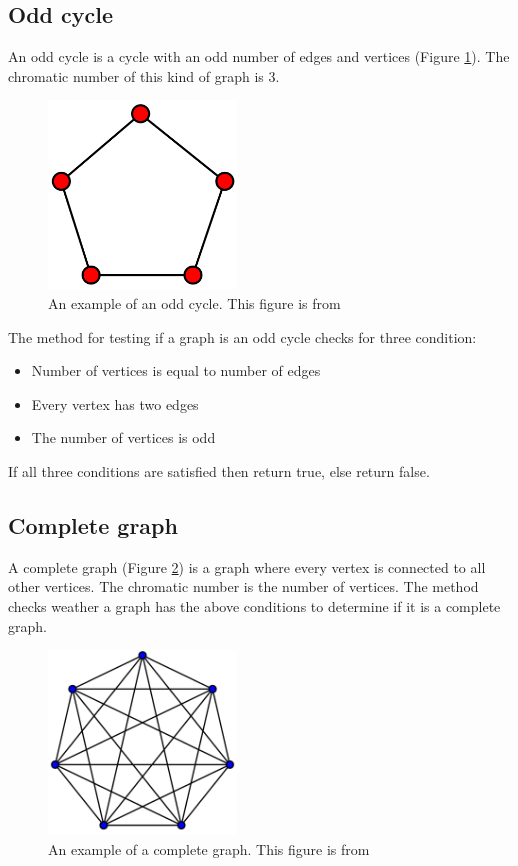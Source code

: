 \documentclass[a4paper]{report}
\begin{document}
			\subsection{Odd cycle}
			An odd cycle is a cycle with an odd number of edges and vertices (Figure \ref{fig:oddcycle}). The chromatic number of this kind of graph is 3. \\
			
			\begin{figure}[h]
				\centering
				\includegraphics[width=50mm,scale=0.5]{figures/cycle.png}
				\caption{An example of an odd cycle. This figure is from \protect\cite{cycleFig}}
				\label{fig:oddcycle}
			\end{figure}
		
			The method for testing if a graph is an odd cycle checks for three condition:
			\begin{itemize}
				\item Number of vertices is equal to number of edges
				\item Every vertex has two edges
				\item The number of vertices is odd
			\end{itemize}
			If all three conditions are satisfied then return true, else return false.
			
			\subsection{Complete graph}
			A complete graph (Figure \ref{fig:complete}) is a graph where every vertex is connected to all other vertices. The chromatic number is the number of vertices. The method checks weather a graph has the above conditions to determine if it is a complete graph.
			\begin{figure}[h]
				\centering
				\includegraphics[width=50mm,scale=0.5]{figures/complete.png}
				\caption{An example of a complete graph. This figure is from \protect\cite{completeFig}}
				\label{fig:complete}
			\end{figure}
			
\end{document}

